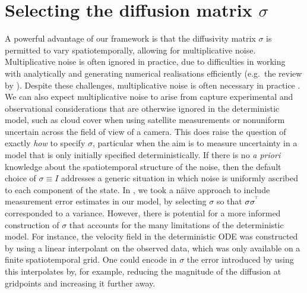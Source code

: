 \section{Selecting the diffusion matrix \(\sigma\)}\label{sec:disc_sigma}
A powerful advantage of our framework is that the diffusivity matrix \(\sigma\) is permitted to vary spatiotemporally, allowing for multiplicative noise.
Multiplicative noise is often ignored in practice, due to difficulties in working with analytically \citep{SanchoEtAl_1982_AnalyticalNumericalStudies} and generating numerical realisations efficiently (e.g.\ the review by \cite{MoraEtAl_2017_StableNumericalScheme}).
Despite these challenges, multiplicative noise is often necessary in practice \citep[e.g.]{Sura_2003_StochasticAnalysisSouthern,KamenkovichEtAl_2015_PropertiesOriginsAnisotropic}.
We can also expect multiplicative noise to arise from capture experimental and observational considerations that are otherwise ignored in the deterministic model, such as cloud cover when using satellite measurements or nonuniform uncertain across the field of view of a camera.
This does raise the question of exactly \emph{how} to specify \(\sigma\), particular when the aim is to measure uncertainty in a model that is only initially specified deterministically.
If there is no \emph{a priori} knowledge about the spatiotemporal structure of the noise, then the default choice of \(\sigma \equiv I\) addresses a generic situation in which noise is uniformly ascribed to each component of the state.
In , we took a n\"aive approach to include measurement error estimates in our model, by selecting \(\sigma\) so that \(\sigma\sigma^{^{\!\top}}\) corresponded to a variance.
However, there is potential for a more informed construction of \(\sigma\) that accounts for the many limitations of the deterministic model.
For instance, the velocity field in the deterministic ODE was constructed by using a linear interpolant on the observed data, which was only available on a finite spatiotemporal grid.
One could encode in \(\sigma\) the error introduced by using this interpolates by, for example, reducing the magnitude of the diffusion at gridpoints and increasing it further away.
